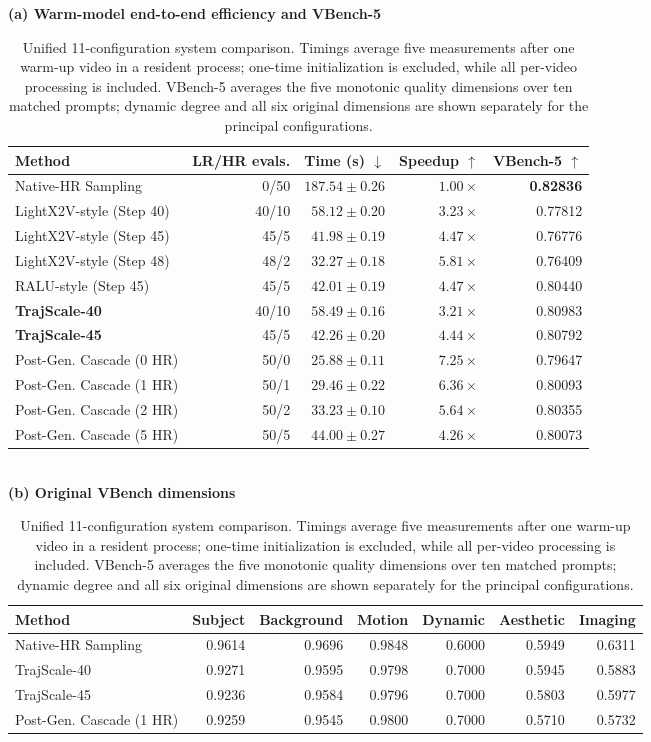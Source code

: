 \begin{table}[!t]
\centering
\footnotesize
\setlength{\tabcolsep}{5pt}
\textbf{(a) Warm-model end-to-end efficiency and VBench-5}\\[2pt]
\begin{tabular}{lrrrr}
\toprule
Method & LR/HR evals. & Time (s) $\downarrow$ & Speedup $\uparrow$ &
VBench-5 $\uparrow$ \\
\midrule
Native-HR Sampling & 0/50 & $187.54\pm0.26$ & $1.00\times$ & \textbf{0.82836} \\
LightX2V-style (Step 40) & 40/10 & $58.12\pm0.20$ & $3.23\times$ & 0.77812 \\
LightX2V-style (Step 45) & 45/5 & $41.98\pm0.19$ & $4.47\times$ & 0.76776 \\
LightX2V-style (Step 48) & 48/2 & $32.27\pm0.18$ & $5.81\times$ & 0.76409 \\
RALU-style (Step 45) & 45/5 & $42.01\pm0.19$ & $4.47\times$ & 0.80440 \\
\textbf{TrajScale-40} & 40/10 & $58.49\pm0.16$ & $3.21\times$ & 0.80983 \\
\textbf{TrajScale-45} & 45/5 & $42.26\pm0.20$ & $4.44\times$ & 0.80792 \\
Post-Gen. Cascade (0 HR) & 50/0 & $25.88\pm0.11$ & $7.25\times$ & 0.79647 \\
Post-Gen. Cascade (1 HR) & 50/1 & $29.46\pm0.22$ & $6.36\times$ & 0.80093 \\
Post-Gen. Cascade (2 HR) & 50/2 & $33.23\pm0.10$ & $5.64\times$ & 0.80355 \\
Post-Gen. Cascade (5 HR) & 50/5 & $44.00\pm0.27$ & $4.26\times$ & 0.80073 \\
\bottomrule
\end{tabular}
\\[5pt]
\textbf{(b) Original VBench dimensions}\\[2pt]
\setlength{\tabcolsep}{3.2pt}
\begin{tabular}{lrrrrrr}
\toprule
Method & Subject & Background & Motion & Dynamic & Aesthetic & Imaging \\
\midrule
Native-HR Sampling & 0.9614 & 0.9696 & 0.9848 & 0.6000 & 0.5949 & 0.6311 \\
TrajScale-40 & 0.9271 & 0.9595 & 0.9798 & 0.7000 & 0.5945 & 0.5883 \\
TrajScale-45 & 0.9236 & 0.9584 & 0.9796 & 0.7000 & 0.5803 & 0.5977 \\
Post-Gen. Cascade (1 HR) & 0.9259 & 0.9545 & 0.9800 & 0.7000 & 0.5710 & 0.5732 \\
\bottomrule
\end{tabular}
\caption{Unified 11-configuration system comparison. Timings average five
measurements after one warm-up video in a resident process; one-time
initialization is excluded, while all per-video processing is included.
VBench-5 averages the five monotonic quality dimensions over ten matched
prompts; dynamic degree and all six original dimensions are shown separately
for the principal configurations.}
\label{tab:system}
\end{table}

